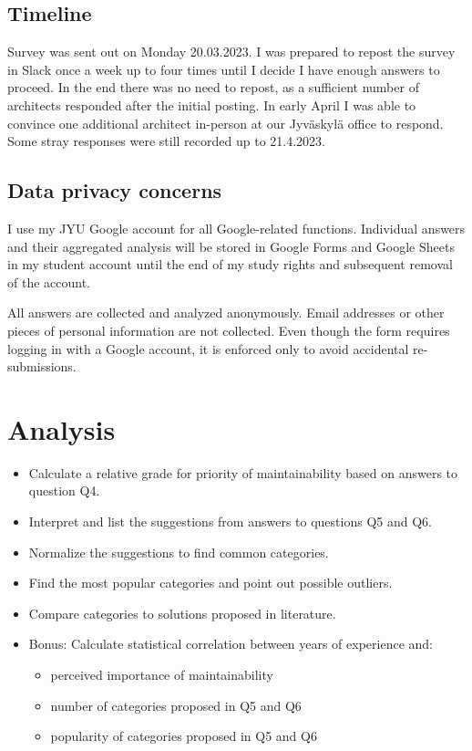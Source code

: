 \documentclass[utf8,english]{gradu3}
\begin{document}
\subsection{Timeline}
Survey was sent out on Monday 20.03.2023.
I was prepared to repost the survey in Slack once a week up to four times until I
decide I have enough answers to proceed.
In the end there was no need to repost, as a sufficient number of architects
responded after the initial posting.
In early April I was able to convince one additional architect in-person at our
Jyväskylä office to respond.
Some stray responses were still recorded up to 21.4.2023.

\subsection{Data privacy concerns}
I use my JYU Google account for all Google-related functions.
Individual answers and their aggregated analysis will be stored in Google Forms and
Google Sheets in my student account until the end of my study rights and
subsequent removal of the account.

All answers are collected and analyzed anonymously.
Email addresses or other pieces of personal information are not collected.
Even though the form requires logging in with a Google account, it is enforced
only to avoid accidental re-submissions.


\section{Analysis}

\begin{itemize}
  \item Calculate a relative grade for priority of maintainability based on answers to question Q4.
  \item Interpret and list the suggestions from answers to questions Q5 and Q6.
  \item Normalize the suggestions to find common categories.
  \item Find the most popular categories and point out possible outliers.
  \item Compare categories to solutions proposed in literature.
  \item Bonus: Calculate statistical correlation between years of experience and:
        \begin{itemize}
          \item perceived importance of maintainability
          \item number of categories proposed in Q5 and Q6
          \item popularity of categories proposed in Q5 and Q6
        \end{itemize}
\end{itemize}
\end{document}
